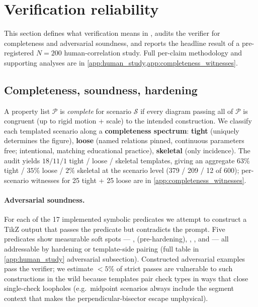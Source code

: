 \section{Verification reliability}
\label{sec:verification}

This section defines what verification means in \GeoGenBench, audits the verifier for completeness and adversarial soundness, and reports the headline result of a pre-registered $N{=}200$ human-correlation study.
Full per-claim methodology and supporting analyses are in \cref{app:human_study,app:completeness_witnesses}.

\subsection{Completeness, soundness, hardening}
\label{ssec:ver_defn}

A property list $\mathcal{P}$ is \emph{complete} for scenario $\mathcal{S}$ if every diagram passing all of $\mathcal{P}$ is congruent (up to rigid motion + scale) to the intended construction.
We classify each templated scenario along a \textbf{completeness spectrum}: \textbf{tight} (uniquely determines the figure), \textbf{loose} (named relations pinned, continuous parameters free; intentional, matching educational practice), \textbf{skeletal} (only incidence).
The audit yields $18 / 11 / 1$ tight / loose / skeletal templates, giving an aggregate $63\%$ tight / $35\%$ loose / $2\%$ skeletal at the scenario level (379 / 209 / 12 of 600); per-scenario witnesses for 25 tight + 25 loose are in \cref{app:completeness_witnesses}.

\paragraph{Adversarial soundness.}
For each of the 17 implemented symbolic predicates we attempt to construct a TikZ output that passes the predicate but contradicts the prompt.
Five predicates show measurable soft spots --- ,  (pre-hardening), , , and  --- all addressable by hardening or template-side pairing (full table in \cref{app:human_study} adversarial subsection).
Constructed adversarial examples pass the verifier; we estimate $<5\%$ of strict passes are vulnerable to such constructions in the wild because templates pair check types in ways that close single-check loopholes (e.g.\ midpoint scenarios always include the segment context that makes the perpendicular-bisector escape unphysical).

